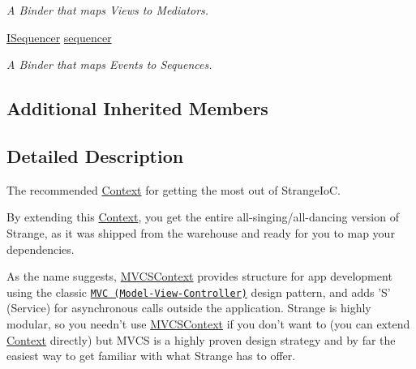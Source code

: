 \begin{DoxyCompactItemize}
\begin{DoxyCompactList}\small\item\em A Binder that maps Views to Mediators. \end{DoxyCompactList}\item 
\hypertarget{classstrange_1_1extensions_1_1context_1_1impl_1_1_m_v_c_s_context_af18bbe60ff223bebf24d0643c07c1c6f}{\hyperlink{interfacestrange_1_1extensions_1_1sequencer_1_1api_1_1_i_sequencer}{I\-Sequencer} \hyperlink{classstrange_1_1extensions_1_1context_1_1impl_1_1_m_v_c_s_context_af18bbe60ff223bebf24d0643c07c1c6f}{sequencer}}\label{classstrange_1_1extensions_1_1context_1_1impl_1_1_m_v_c_s_context_af18bbe60ff223bebf24d0643c07c1c6f}

\begin{DoxyCompactList}\small\item\em A Binder that maps Events to Sequences. \end{DoxyCompactList}\end{DoxyCompactItemize}
\subsection*{Additional Inherited Members}


\subsection{Detailed Description}
The recommended \hyperlink{classstrange_1_1extensions_1_1context_1_1impl_1_1_context}{Context} for getting the most out of Strange\-Io\-C. 

By extending this \hyperlink{classstrange_1_1extensions_1_1context_1_1impl_1_1_context}{Context}, you get the entire all-\/singing/all-\/dancing version of Strange, as it was shipped from the warehouse and ready for you to map your dependencies.

As the name suggests, \hyperlink{classstrange_1_1extensions_1_1context_1_1impl_1_1_m_v_c_s_context}{M\-V\-C\-S\-Context} provides structure for app development using the classic \href{http://en.wikipedia.org/wiki/Model%E2%80%93view%E2%80%93controller}{\tt M\-V\-C (Model-\/\-View-\/\-Controller)} design pattern, and adds 'S' (Service) for asynchronous calls outside the application. Strange is highly modular, so you needn't use \hyperlink{classstrange_1_1extensions_1_1context_1_1impl_1_1_m_v_c_s_context}{M\-V\-C\-S\-Context} if you don't want to (you can extend \hyperlink{classstrange_1_1extensions_1_1context_1_1impl_1_1_context}{Context} directly) but M\-V\-C\-S is a highly proven design strategy and by far the easiest way to get familiar with what Strange has to offer.

